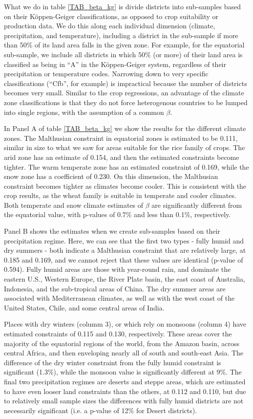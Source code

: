\documentclass[11pt]{article}
\begin{document}
What we do in table \ref{TAB_beta_kg} is divide districts into sub-samples based on their K{\"o}ppen-Geiger classifications, as opposed to crop suitability or production data. We do this along each individual dimension (climate, precipitation, and temperature), including a district in the sub-sample if more than 50\% of its land area falls in the given zone. For example, for the equatorial sub-sample, we include all districts in which 50\% (or more) of their land area is classified as being in ``A'' in the K{\"o}ppen-Geiger system, regardless of their precipitation or temperature codes. Narrowing down to very specific classifications (``Cfb'', for example) is impractical because the number of districts becomes very small. Similar to the crop regressions, an advantage of the climate zone classifications is that they do not force heterogenous countries to be lumped into single regions, with the assumption of a common $\beta$. 

In Panel A of table \ref{TAB_beta_kg} we show the results for the different climate zones. The Malthusian constraint in equatorial zones is estimated to be 0.111, similar in size to what we saw for areas suitable for the rice family of crops. The arid zone has an estimate of 0.154, and then the estimated constraints become tighter. The warm temperate zone has an estimated constraint of 0.169, while the snow zone has a coefficient of 0.230. On this dimension, the Malthusian constraint becomes tighter as climates become cooler. This is consistent with the crop results, as the wheat family is suitable in temperate and cooler climates. Both temperate and snow climate estimates of $\beta$ are significantly different from the equatorial value, with p-values of 0.7\% and less than 0.1\%, respectively.

Panel B shows the estimates when we create sub-samples based on their precipitation regime. Here, we can see that the first two types - fully humid and dry summers - both indicate a Malthusian constraint that are relatively large, at 0.185 and 0.169, and we cannot reject that these values are identical (p-value of 0.594). Fully humid areas are those with year-round rain, and dominate the eastern U.S., Western Europe, the River Plate basin, the east coast of Australia, Indonesia, and the sub-tropical areas of China. The dry summer areas are associated with Mediterranean climates, as well as with the west coast of the United States, Chile, and some central areas of India.

Places with dry winters (columm 3), or which rely on monsoons (column 4) have estimated constraints of 0.115 and 0.130, respectively. These areas cover the majority of the equatorial regions of the world, from the Amazon basin, across central Africa, and then enveloping nearly all of south and south-east Asia. The difference of the dry winter constraint from the fully humid constraint is significant (1.3\%), while the monsoon value is significantly different at 9\%. The final two precipitation regimes are deserts and steppe areas, which are estimated to have even looser land constraints than the others, at 0.112 and 0.110, but due to relatively small sample sizes the differences with fully humid districts are not necessarily significant (i.e. a p-value of 12\% for Desert districts).
\end{document}
